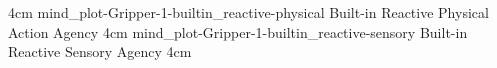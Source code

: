 {{                                                              {4cm}}
{\experimentcausegroupplots{\dataappendixmaxtime}
                           {\dataappendixexperimentonemaxtime}
                           {\dataappendixexperimenttwomaxtime}
                           {\dataappendixexperimentthreemaxtime}
                           {\dataappendixexperimentonename}
                           {\dataappendixexperimenttwoname}
                           {\dataappendixexperimentthreename}
                           {\dataappendixexperimentoneprettyname}
                           {\dataappendixexperimenttwoprettyname}
                           \experimentcausegroupplotscontinued{\dataappendixexperimentthreeprettyname}
                                                              {mind_plot-Gripper-1-builtin_reactive-physical}
                                                              {Built-in Reactive Physical Action Agency}
                                                              {\experimentdatacommontablereference}
                                                              {4cm}}
{\experimentcausegroupplots{\dataappendixmaxtime}
                           {\dataappendixexperimentonemaxtime}
                           {\dataappendixexperimenttwomaxtime}
                           {\dataappendixexperimentthreemaxtime}
                           {\dataappendixexperimentonename}
                           {\dataappendixexperimenttwoname}
                           {\dataappendixexperimentthreename}
                           {\dataappendixexperimentoneprettyname}
                           {\dataappendixexperimenttwoprettyname}
                           \experimentcausegroupplotscontinued{\dataappendixexperimentthreeprettyname}
                                                              {mind_plot-Gripper-1-builtin_reactive-sensory}
                                                              {Built-in Reactive Sensory Agency}
                                                              {\experimentdatacommontablereference}
                                                              {4cm}}




}
